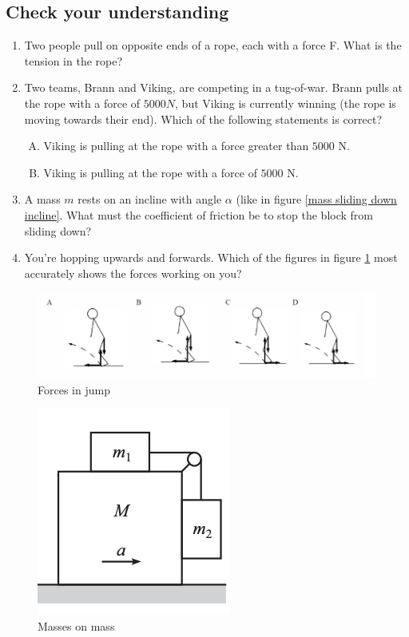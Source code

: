 \documentclass{article}
\begin{document}
\subsection{Check your understanding}
\begin{enumerate}

\item Two people pull on opposite ends of a rope, each with a force F. What is the tension in the rope?

\item Two teams, Brann and Viking, are competing in a tug-of-war. Brann pulls at the rope with a force of $5000 N$, but Viking is currently winning (the rope is moving towards their end). Which of the following statements is correct? 
    \begin{enumerate}[A.]
        \item Viking is pulling at the rope with a force greater than $5000$ N.
        \item Viking is pulling at the rope with a force of $5000$ N.
    \end{enumerate}

\item A mass $m$ rests on an incline with angle $\alpha$ (like in figure \ref{mass sliding down incline}. What must the coefficient of friction be to stop the block from sliding down?

\item You're hopping upwards and forwards. Which of the figures in figure \ref{forces in jump} most accurately shows the forces working on you?
\end{enumerate}

\begin{figure}
    \centering
    \includegraphics[width=0.5\linewidth]{assets/jumps.png}
    \caption{Forces in jump}
    \label{forces in jump}
\end{figure}

\begin{figure}
    \centering
    \includegraphics[width=0.5\linewidth]{assets/masses on mass.png}
    \caption{Masses on mass}
    \label{masses on mass}
\end{figure}
\end{document}
